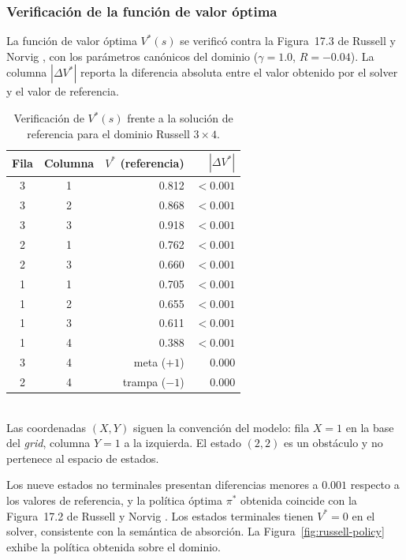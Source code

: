 \subsubsection{Verificación de la función de valor óptima}
\label{sec:exp-russell-v}

La función de valor óptima $V^*(s)$ se verificó contra la Figura~17.3 de Russell y Norvig \cite{russell2016artificial}, con los parámetros canónicos del dominio ($\gamma = 1.0$, $R = -0.04$). La columna $|\Delta V^*|$ reporta la diferencia absoluta entre el valor obtenido por el solver y el valor de referencia.

\begin{table}[htbp]
    \centering
    \caption{Verificación de $V^*(s)$ frente a la solución de referencia para el dominio Russell $3 \times 4$.}
    \label{tab:exp-russell-v}
    \small
    \begin{tabular}{c c r r}
        \toprule
        \textbf{Fila} & \textbf{Columna} & $V^*$ \textbf{(referencia)} & $|\Delta V^*|$ \\
        \midrule
        3 & 1 & 0.812 & $< 0.001$ \\
        3 & 2 & 0.868 & $< 0.001$ \\
        3 & 3 & 0.918 & $< 0.001$ \\
        2 & 1 & 0.762 & $< 0.001$ \\
        2 & 3 & 0.660 & $< 0.001$ \\
        1 & 1 & 0.705 & $< 0.001$ \\
        1 & 2 & 0.655 & $< 0.001$ \\
        1 & 3 & 0.611 & $< 0.001$ \\
        1 & 4 & 0.388 & $< 0.001$ \\
        \midrule
        3 & 4 & meta ($+1$)    & 0.000 \\
        2 & 4 & trampa ($-1$)  & 0.000 \\
        \bottomrule
    \end{tabular}
    \smallskip\\
    \footnotesize{Las coordenadas $(X, Y)$ siguen la convención del modelo: fila $X = 1$ en la base del \textit{grid}, columna $Y = 1$ a la izquierda. El estado $(2,2)$ es un obstáculo y no pertenece al espacio de estados.}
\end{table}

Los nueve estados no terminales presentan diferencias menores a $0.001$ respecto a los valores de referencia, y la política óptima $\pi^*$ obtenida coincide con la Figura~17.2 de Russell y Norvig \cite{russell2016artificial}. Los estados terminales tienen $V^* = 0$ en el solver, consistente con la semántica de absorción.
La Figura~\ref{fig:russell-policy} exhibe la política obtenida sobre el dominio.

